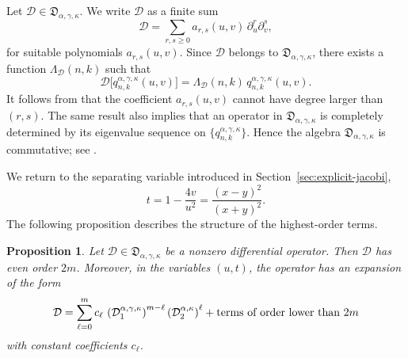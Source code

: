 \documentclass[reqno,10pt]{amsart}
\theoremstyle{plain}
\newtheorem{proposition}[theorem]{Proposition}
\numberwithin{equation}{section}
\numberwithin{figure}{section}
\begin{document}
Let \(\mathcal{D}\in\mathfrak{D}_{\alpha,\gamma,\kappa}\). We write $\mathcal D$ as a finite sum
\[
\mathcal D
=
\sum_{r,s\geq0}
a_{r,s}(u,v)\,\partial_u^r\partial_v^s,
\]
for suitable polynomials \(a_{r,s}(u,v)\). Since \(\mathcal{D}\) belongs to
\(\mathfrak{D}_{\alpha,\gamma,\kappa}\), there exists a function
\(\Lambda_{\mathcal{D}}(n,k)\) such that
\[
\mathcal{D}
\big[q_{n,k}^{\alpha,\gamma,\kappa}(u,v)\big]
=
\Lambda_{\mathcal{D}}(n,k)\,
q_{n,k}^{\alpha,\gamma,\kappa}(u,v).
\]
It follows from \cite[Lemma~7.1]{AMP25} that the coefficient
$a_{r,s}(u,v)$ cannot have degree larger than \((r,s)\). The same result
also implies that an operator in \(\mathfrak{D}_{\alpha,\gamma,\kappa}\)
is completely determined by its eigenvalue sequence on
\(\{q_{n,k}^{\alpha,\gamma,\kappa}\}\). Hence the algebra
\(\mathfrak{D}_{\alpha,\gamma,\kappa}\) is commutative; see
\cite[Corollary~7.2]{AMP25}.

We return to the separating variable introduced in
Section~\ref{sec:explicit-jacobi},
\[
t=1-\frac{4v}{u^2}
=\frac{(x-y)^2}{(x+y)^2}.
\]
The following proposition describes the structure of the highest-order terms.

\begin{proposition}\label{lem:highest_order_generated}
Let \(\mathcal D\in\mathfrak D_{\alpha,\gamma,\kappa}\) be a nonzero
differential operator. Then \(\mathcal D\) has even order \(2m\).
Moreover, in the variables \((u,t)\), the operator has an expansion of the
form
\begin{equation}\label{eq:highest-order-expansion-generated}
\mathcal D
=
\sum_{\ell=0}^{m}
c_\ell\,
\left(\mathcal D_{1}^{\alpha,\gamma,\kappa}\right)^{m-\ell}
\left(\mathcal D_{2}^{\alpha,\kappa}\right)^{\ell}
+
\textup{terms of order lower than }2m
\end{equation}
with constant coefficients \(c_\ell\).
\end{proposition}
\end{document}
